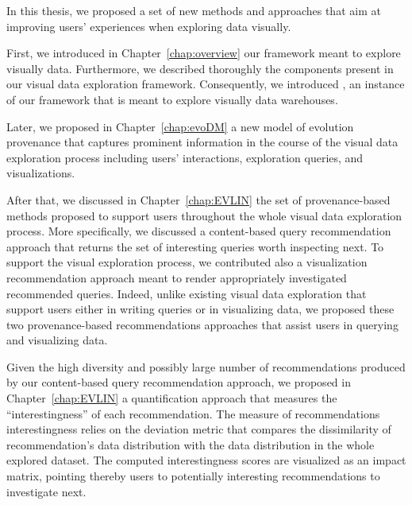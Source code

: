 
In this thesis, we proposed a set of new methods and approaches that aim at improving users' experiences when exploring data visually.

First, we introduced in Chapter~\ref{chap:overview} our framework \framework{} meant to explore visually data. Furthermore, we described thoroughly the components present in our visual data exploration framework. 
Consequently, we introduced \prototype{}, an instance of our framework that is meant to explore visually data warehouses. 

Later, we proposed in Chapter~\ref{chap:evoDM} a new model of evolution provenance that captures prominent information in the course of the visual data exploration process including users' interactions, exploration queries, and visualizations. 

After that, %
we discussed in Chapter~\ref{chap:EVLIN} the set of provenance-based methods proposed to support users throughout the whole visual data exploration process.
More specifically, we discussed a content-based query recommendation approach that returns the set of interesting queries worth inspecting next.
 To support the visual exploration process, we contributed also a visualization recommendation approach meant to render appropriately investigated recommended queries.
 Indeed, unlike existing visual data exploration that support users either in writing queries or in visualizing data, we proposed these two provenance-based recommendations approaches that assist users in querying and visualizing data. 

Given the high diversity and possibly large number of recommendations produced by our content-based query recommendation approach, we proposed in Chapter~\ref{chap:EVLIN} a quantification approach that measures the ``interestingness'' of each recommendation. The measure of recommendations interestingness relies on the deviation metric that compares the dissimilarity of recommendation's data distribution with the data distribution in the whole explored dataset.
The computed interestingness scores are visualized as an impact matrix, pointing thereby users to potentially interesting recommendations to investigate next.

